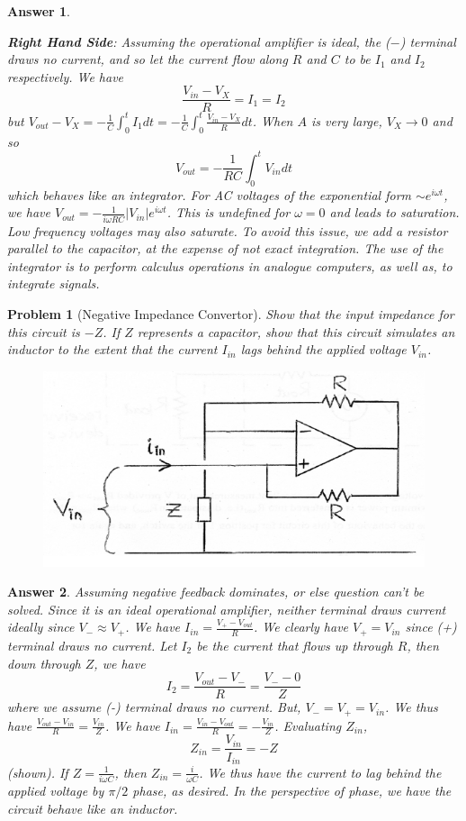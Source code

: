 \documentclass[a4paper]{article}
\newtheorem{ans}{Answer}[section]
\theoremstyle{new}
\newtheorem{qns}{Problem}[section]
\begin{document}
\begin{ans}
\begin{enumerate}[label=(\alph*)]
\textbf{Right Hand Side}: Assuming the operational amplifier is ideal, the ($-$) terminal draws no current, and so let the current flow along $R$ and $C$ to be $I_1$ and $I_2$ respectively. We have
$$\frac{V_{in}-V_X}{R}=I_1=I_2$$
but $V_{out}-V_X=-\frac{1}{C}\int_0^tI_1dt=-\frac{1}{C}\int_0^t\frac{V_{in}-V_X}{R}dt$. When $A$ is very large, $V_X\rightarrow 0$ and so
$$V_{out}=-\frac{1}{RC}\int_0^tV_{in}dt$$
which behaves like an integrator. For AC voltages of the exponential form $\sim e^{i\omega t}$, we have $V_{out}=-\frac{1}{i\omega RC}|V_{in}|e^{i\omega t}$. This is undefined for $\omega=0$ and leads to saturation. Low frequency voltages may also saturate. To avoid this issue, we add a resistor parallel to the capacitor, at the expense of not exact integration. The use of the integrator is to perform calculus operations in analogue computers, as well as, to integrate signals. 
\end{enumerate}
\end{ans}
\begin{qns}[Negative Impedance Convertor]
Show that the input impedance for this circuit is $-Z$. If $Z$ represents a capacitor, show that this circuit simulates an inductor to the extent that the current $I_{in}$ lags behind the applied voltage $V_{in}$.
\end{qns}
\begin{figure}[H]
    \centering
    \includegraphics[scale=0.5]{1_2.PNG}
\end{figure}
\begin{ans}
Assuming negative feedback dominates, or else question can't be solved. Since it is an ideal operational amplifier, neither terminal draws current ideally since $V_-\approx V_+$. We have $I_{in}=\frac{V_+-V_{out}}{R}$. We clearly have $V_+=V_{in}$ since (+) terminal draws no current. Let $I_2$ be the current that flows up through $R$, then down through $Z$, we have 
$$I_2=\frac{V_{out}-V_-}{R}=\frac{V_--0}{Z}$$
where we assume (-) terminal draws no current. But, $V_-=V_+=V_{in}$. We thus have $\frac{V_{out}-V_{in}}{R}=\frac{V_{in}}{Z}$. We have $I_{in}=\frac{V_{in}-V_{out}}{R}=-\frac{V_{in}}{Z}$. Evaluating $Z_{in}$,
$$Z_{in}=\frac{V_{in}}{I_{in}}=-Z$$
(shown). If $Z=\frac{1}{i\omega C}$, then $Z_{in}=\frac{i}{\omega C}$. We thus have the current to lag behind the applied voltage by $\pi/2$ phase, as desired. In the perspective of phase, we have the circuit behave like an inductor.
\end{ans}
\newpage
\end{document}

